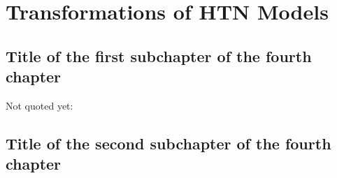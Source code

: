\chapter{Transformations of {HTN} {M}odels}

\section{Title of the first subchapter of the fourth chapter}

Not quoted yet: \cite{inproceedings}

\section{Title of the second subchapter of the fourth chapter}